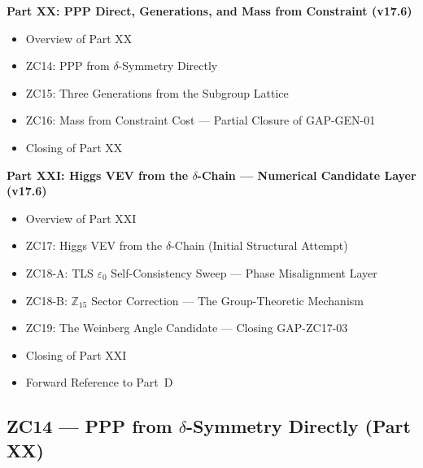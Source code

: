 \documentclass[11pt, a4paper]{article}
\begin{document}
\begin{contentsbox}[title={Part C --- Part and Section Headers}]
\textbf{Part XX: PPP Direct, Generations, and Mass from Constraint (v17.6)}
\begin{itemize}[noitemsep,leftmargin=1.5em]
  \item Overview of Part XX
  \item ZC14: PPP from $\delta$-Symmetry Directly
  \item ZC15: Three Generations from the Subgroup Lattice
  \item ZC16: Mass from Constraint Cost --- Partial Closure of GAP-GEN-01
  \item Closing of Part XX
\end{itemize}

\textbf{Part XXI: Higgs VEV from the $\delta$-Chain --- Numerical Candidate Layer (v17.6)}
\begin{itemize}[noitemsep,leftmargin=1.5em]
  \item Overview of Part XXI
  \item ZC17: Higgs VEV from the $\delta$-Chain (Initial Structural Attempt)
  \item ZC18-A: TLS $\varepsilon_0$ Self-Consistency Sweep --- Phase Misalignment Layer
  \item ZC18-B: $\mathbb{Z}_{15}$ Sector Correction --- The Group-Theoretic Mechanism
  \item ZC19: The Weinberg Angle Candidate --- Closing GAP-ZC17-03
  \item Closing of Part XXI
  \item Forward Reference to Part~D
\end{itemize}
\end{contentsbox}

\subsection{ZC14 --- PPP from $\delta$-Symmetry Directly (Part XX)}
\end{document}
